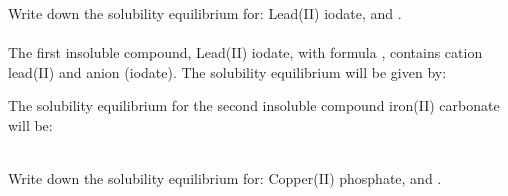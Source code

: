 \documentclass[main.tex]{subfiles}
\begin{document}
\begin{description}
\begin{example} %
Write down the solubility equilibrium for: Lead(II) iodate, and .
\\
\\
The first insoluble compound, Lead(II) iodate, with formula , contains cation lead(II)  and anion  (iodate). The solubility equilibrium will be given by: 
\begin{center}	 \end{center}
The solubility equilibrium for the second insoluble compound iron(II) carbonate will be:
\begin{center}	 \end{center}
\faDiamond\ \\
Write down the solubility equilibrium for: Copper(II) phosphate, and .
\\
\end{example}%















\end{description}
\end{document}
